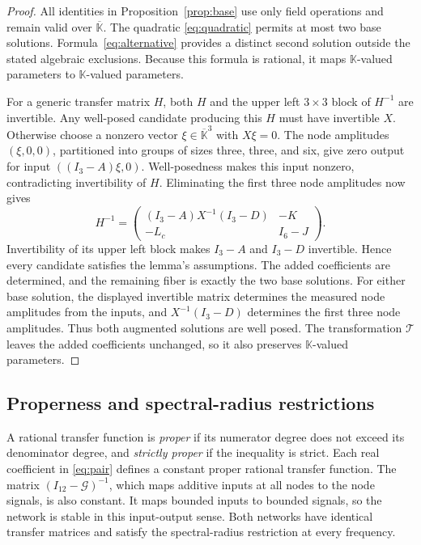 \documentclass[letterpaper,10pt,conference]{ieeeconf}
\begin{document}
\begin{proof}
All identities in Proposition~\ref{prop:base} use only field
operations and remain valid over \(\overline{\mathbb K}\).
The quadratic \eqref{eq:quadratic} permits at most two base solutions.
Formula~\eqref{eq:alternative} provides a distinct second solution
outside the stated algebraic exclusions. Because this formula is
rational, it maps \(\mathbb K\)-valued parameters to
\(\mathbb K\)-valued parameters.

For a generic transfer matrix \(H\), both \(H\) and the upper left
\(3\times3\) block of \(H^{-1}\) are invertible.
Any well-posed candidate producing this \(H\) must have invertible
\(X\). Otherwise choose a nonzero vector
\(\xi\in\overline{\mathbb K}^3\) with \(X\xi=0\).
The node amplitudes \((\xi,0,0)\), partitioned into groups of sizes
three, three, and six, give zero output for input
\(((I_3-A)\xi,0)\). Well-posedness makes this input nonzero,
contradicting invertibility of \(H\).
Eliminating the first three node amplitudes now gives
\[
 H^{-1}=
 \begin{pmatrix}
 (I_3-A)X^{-1}(I_3-D)&-K\\
 -L_c&I_6-J
 \end{pmatrix}.
\]
Invertibility of its upper left block makes \(I_3-A\) and
\(I_3-D\) invertible. Hence every candidate satisfies the lemma's
assumptions. The added coefficients are determined, and the remaining
fiber is exactly the two base solutions. For either base solution,
the displayed invertible matrix determines the measured node amplitudes
from the inputs, and \(X^{-1}(I_3-D)\) determines the first three
node amplitudes. Thus both augmented solutions are well posed.
The transformation \(\mathcal T\) leaves the added coefficients
unchanged, so it also preserves \(\mathbb K\)-valued parameters.
\end{proof}

\subsection{Properness and spectral-radius restrictions}

A rational transfer function is \emph{proper} if its numerator
degree does not exceed its denominator degree, and
\emph{strictly proper} if the inequality is strict.
Each real coefficient in \eqref{eq:pair} defines a constant proper
rational transfer function.
The matrix \((I_{12}-\mathcal G)^{-1}\), which maps additive inputs
at all nodes to the node signals, is also constant. It maps bounded
inputs to bounded signals, so the network is stable in this
input-output sense. Both networks have identical transfer matrices
and satisfy the spectral-radius restriction at every frequency.
\end{document}

